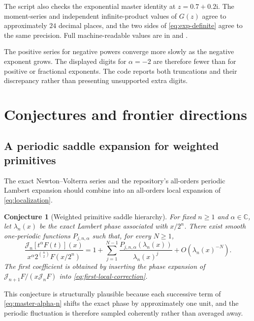 \documentclass[11pt,oneside]{article}
\newtheorem{conjecture}[theorem]{Conjecture}
\theoremstyle{definition}
\theoremstyle{remark}
\newcommand{\C}{\mathbb C}
\newcommand{\ii}{\mathrm i}
\newcommand{\Jn}{\mathcal J}
\newcommand{\1}{\mathbf 1}
\begin{document}
The script also checks the exponential master identity at
\(z=0.7+0.2\ii\).  The moment-series and independent infinite-product values
of \(G(z)\) agree to approximately \(24\) decimal places, and the two sides of
\eqref{eq:exp-definite} agree to the same precision.  Full machine-readable
values are in  and
.

\begin{warningbox}
The positive series for negative powers converge more slowly as the negative
exponent grows.  The displayed digits for \(\alpha=-2\) are therefore fewer
than for positive or fractional exponents.  The code reports both truncations
and their discrepancy rather than presenting unsupported extra digits.
\end{warningbox}

\section{Conjectures and frontier directions}
\label{sec:conjectures}

\subsection{A periodic saddle expansion for weighted primitives}
The exact Newton--Volterra series and the repository's all-orders periodic
Lambert expansion should combine into an all-orders local expansion of
\eqref{eq:localization}.

\begin{conjecture}[Weighted primitive saddle hierarchy]\label{conj:weighted-saddle}
For fixed \(n\geq1\) and \(\alpha\in\C\), let \(\lambda_n(x)\) be the exact
Lambert phase associated with \(x/2^n\).  There exist smooth one-periodic
functions \(P_{j,n,\alpha}\) such that, for every \(N\geq1\),
\begin{equation}
 \frac{\Jn_n[t^\alpha F(t)](x)}
 {x^\alpha2^{\binom n2}F(x/2^n)}
 =1+\sum_{j=1}^{N-1}
 \frac{P_{j,n,\alpha}(\lambda_n(x))}{\lambda_n(x)^j}
 +O(\lambda_n(x)^{-N}).                                       \label{eq:conj-weighted-saddle}
\end{equation}
The first coefficient is obtained by inserting the phase expansion of
\(\Jn_{n+1}F/(x\Jn_nF)\) into \eqref{eq:first-local-correction}.
\end{conjecture}

This conjecture is structurally plausible because each successive term of
\eqref{eq:master-alpha-n} shifts the exact phase by approximately one unit,
and the periodic fluctuation is therefore sampled coherently rather than
averaged away.
\end{document}

